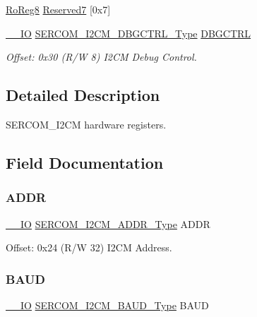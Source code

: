 \begin{DoxyCompactItemize}
\mbox{\hyperlink{group___s_a_m_d21_e15_a__definitions_ga0d957f1433aaf5d70e4dc2b68288442d}{Ro\+Reg8}} \mbox{\hyperlink{struct_sercom_i2cm_ac62316933748936602e583c937c6991d}{Reserved7}} \mbox{[}0x7\mbox{]}
\item 
\mbox{\hyperlink{core__cm0plus_8h_aec43007d9998a0a0e01faede4133d6be}{\+\_\+\+\_\+\+IO}} \mbox{\hyperlink{union_s_e_r_c_o_m___i2_c_m___d_b_g_c_t_r_l___type}{S\+E\+R\+C\+O\+M\+\_\+\+I2\+C\+M\+\_\+\+D\+B\+G\+C\+T\+R\+L\+\_\+\+Type}} \mbox{\hyperlink{struct_sercom_i2cm_aa3a63d86d50abbc08fd0afa89947443d}{D\+B\+G\+C\+T\+RL}}
\begin{DoxyCompactList}\small\item\em Offset\+: 0x30 (R/W 8) I2\+CM Debug Control. \end{DoxyCompactList}\end{DoxyCompactItemize}


\subsection{Detailed Description}
S\+E\+R\+C\+O\+M\+\_\+\+I2\+CM hardware registers. 

\subsection{Field Documentation}
\mbox{\label{struct_sercom_i2cm_a68e13b8e9b88cba0314a06023a08be3d}} 
\subsubsection{\texorpdfstring{ADDR}{ADDR}}
{\footnotesize\ttfamily \mbox{\hyperlink{core__cm0plus_8h_aec43007d9998a0a0e01faede4133d6be}{\+\_\+\+\_\+\+IO}} \mbox{\hyperlink{union_s_e_r_c_o_m___i2_c_m___a_d_d_r___type}{S\+E\+R\+C\+O\+M\+\_\+\+I2\+C\+M\+\_\+\+A\+D\+D\+R\+\_\+\+Type}} A\+D\+DR}



Offset\+: 0x24 (R/W 32) I2\+CM Address. 

\mbox{\label{struct_sercom_i2cm_a9287d14348af899d0c2a3251a85de724}} 
\subsubsection{\texorpdfstring{BAUD}{BAUD}}
{\footnotesize\ttfamily \mbox{\hyperlink{core__cm0plus_8h_aec43007d9998a0a0e01faede4133d6be}{\+\_\+\+\_\+\+IO}} \mbox{\hyperlink{union_s_e_r_c_o_m___i2_c_m___b_a_u_d___type}{S\+E\+R\+C\+O\+M\+\_\+\+I2\+C\+M\+\_\+\+B\+A\+U\+D\+\_\+\+Type}} B\+A\+UD}



